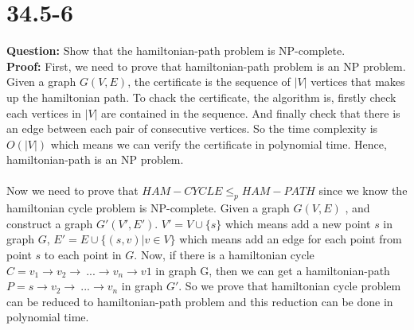 \documentclass[12pt]{article}
\begin{document}
\section{34.5-6}
\textbf{Question: }Show that the hamiltonian-path problem is NP-complete.\\
\textbf{Proof: } First, we need to prove that hamiltonian-path problem is an NP problem.
Given a graph \(G(V,E)\), the certificate is the sequence of \(|V|\) vertices that makes up the hamiltonian path. To chack the certificate, the algorithm is, firstly check each vertices in \(|V|\) are contained in the sequence. And finally check that there is an edge between each pair of consecutive vertices. So the time complexity is \(O(|V|)\) which means we can verify the certificate in polynomial time. Hence, hamiltonian-path is an NP problem.
\\
\\
Now we need to prove that \(HAM-CYCLE \leq_p HAM-PATH\) since we know the hamiltonian cycle problem is NP-complete. Given a graph \(G(V,E)\) , and construct a graph \(G'(V',E')\). \(V'= V\cup\{s\}\) which means add a new point \(s\) in graph \(G\), \(E' = E \cup\{(s,v)| v\in V\}\) which means add an edge for each point from point \(s\) to each point in \(G\). 
Now, if there is a hamiltonian cycle \(C=v_1\rightarrow v_2\rightarrow\ ... \rightarrow v_n\rightarrow v1\) in graph G, then we can get a hamiltonian-path \(P= s\rightarrow v_2\rightarrow\ ... \rightarrow v_n\) in graph \(G'\). So we prove that hamiltonian cycle problem can be reduced to hamiltonian-path problem and this reduction can be done in polynomial time.
\end{document}
